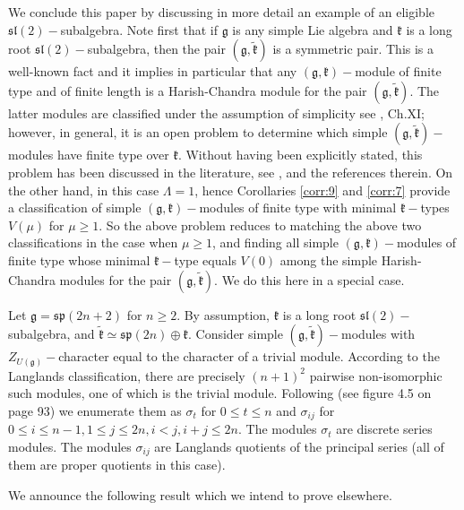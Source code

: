 \documentclass[default]{./styles/svmult}
\renewcommand{\gg}{\mathfrak{g}}
\newcommand{\kk}{\mathfrak{k}}
\renewcommand{\sp}{\mathfrak{sp}}
\renewcommand{\sl}{\mathfrak{sl}}
\begin{document}
We conclude this paper by discussing in more detail an example of an eligible $\sl(2)-$subalgebra. Note first that if $\gg$ is any simple Lie algebra and $\kk$ is a long root $\sl(2)-$subalgebra, then the pair $(\gg,\tilde{\kk})$ is a symmetric pair. This is a well-known fact and it implies in particular that any $(\gg,\kk)-$module of finite type and of finite length is a Harish-Chandra module for the pair $(\gg,\tilde{\kk})$. The latter modules are classified under the assumption of simplicity see \cite{KV}, Ch.XI; however, in general, it is an open problem to determine which simple $(\gg,\tilde{\kk})-$modules have finite type over $\kk$. Without having been explicitly stated, this problem has been discussed in the literature, see \cite{GW}, \cite{OW} and the references therein. On the other hand, in this case $\Lambda = 1$, hence Corollaries \ref{corr:9} and \ref{corr:7} provide a classification of simple $(\gg,\kk)-$modules of finite type with minimal $\kk-$types $V(\mu)$ for $\mu \geq 1$. So the above problem 
reduces to matching the above two classifications in the case when $\mu \geq 1$, and finding all simple $(\gg,\kk)-$modules of finite type whose minimal $\kk-$type equals $V(0)$ among the simple Harish-Chandra modules for the pair $(\gg,\tilde{\kk})$. We do this here in a special case.

Let $\gg = \sp(2n+2)$ for $n \geq 2$. By assumption, $\kk$ is a long root $\sl(2)-$subalgebra, and $\tilde{\kk} \simeq \sp(2n)\oplus\kk$. Consider simple $(\gg,\tilde{\kk})-$modules with $Z_{U(\gg)}-$character equal to the character of a trivial module. According to the Langlands classification, there are precisely $(n+1)^2$ pairwise non-isomorphic such modules, one of which is the trivial module. Following \cite{Co} (see figure 4.5 on page 93) we enumerate them as $\sigma_{t}$ for $0 \leq t \leq n$ and $\sigma_{ij}$ for $0 \leq i \leq n-1, 1 \leq j \leq 2n, i < j, i+j \leq 2n$. The modules $\sigma_t$ are discrete series modules. The modules $\sigma_{ij}$ are Langlands quotients of the principal series (all of them are proper quotients in this case).

We announce the following result which we intend to prove elsewhere.
\end{document}
